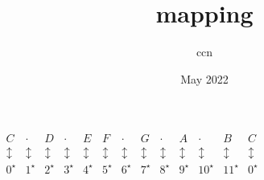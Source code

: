 \documentclass{standalone}
\title{mapping}
\author{ccn }
\date{May 2022}
\begin{document}
    \begin{center}
    $\begin{array}{ccccccccccccc}
        C& \cdot& D& \cdot& E& F& \cdot& G& \cdot& A& \cdot& B & C \\
        \updownarrow & \updownarrow & \updownarrow & \updownarrow & \updownarrow & \updownarrow & \updownarrow & \updownarrow & \updownarrow & \updownarrow & \updownarrow & \updownarrow & \updownarrow \\
        0^\star & 1^\star & 2^\star & 3^\star & 4^\star & 5^\star & 6^\star & 7^\star & 8^\star & 9^\star & 10^\star & 11^\star & 0^\star\\
    \end{array} $
    \end{center}
\end{document}
